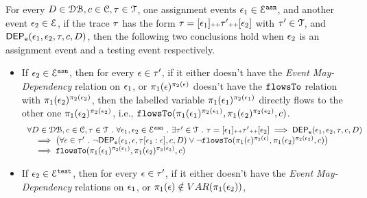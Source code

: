 \begin{lem}
		\label{lem:inv_indepevents}
		For every $D \in \mathcal{DB} , c \in \mathcal{C}, \mathtt{\tau} \in \mathcal{T}$, one assignment events 
		$\mathtt{\epsilon}_1\in \mathcal{E}^{\mathtt{{asn}}}$, and another event $\mathtt{\epsilon}_2 \in \mathcal{E}$,
		if the trace $\mathtt{\tau}$ has the form $\mathtt{\tau} = [\mathtt{\epsilon}_1] {\scriptscriptstyle ++} \mathtt{\tau}' {\scriptscriptstyle ++} [\mathtt{\epsilon}_2]$ with $\mathtt{\tau}' \in \mathcal{T}$, 
		and $\mathsf{DEP_{\mathtt{e}}}(\mathtt{\epsilon}_1, \mathtt{\epsilon}_2, \mathtt{\tau}, c, D)$,
		then the following two conclusions hold when $\mathtt{\epsilon}_2$ is an assignment event and a testing event respectively.
	\begin{itemize}
		\item
		If $\mathtt{\epsilon}_2 \in \mathcal{E}^{\mathtt{{asn}}}$,
		then for every $\mathtt{\epsilon} \in \mathtt{\tau}'$, if it either doesn't have the \emph{Event May-Dependency} relation on $\mathtt{\epsilon}_1$, 
		or $\pi_1(\mathtt{\epsilon})^{\pi_2(\mathtt{\epsilon})}$ doesn't have the $\mathtt{flowsTo}$ relation with $ \pi_1(\mathtt{\epsilon}_2)^{\pi_2(\mathtt{\epsilon}_2)}$,
		then the labelled variable $\pi_1(\mathtt{\epsilon}_1)^{\pi_2(\mathtt{\epsilon}_1)}$ directly flows to the other one $\pi_1(\mathtt{\epsilon}_2)^{\pi_2(\mathtt{\epsilon}_2)}$, 
		i.e., $\mathtt{flowsTo}(\pi_1(\mathtt{\epsilon}_1)^{\pi_2(\mathtt{\epsilon}_1)}, \pi_1(\mathtt{\epsilon}_2)^{\pi_2(\mathtt{\epsilon}_2)}, c)$.
		\[
		\begin{array}{l}
			\forall D \in \dbdom , c \in \cdom, \trace \in \mathcal{T} \st \forall \event_1, \event_2 \in \eventset^{\asn} \st
			 \exists \trace' \in \mathcal{T} \st \trace = [\event_1] \tracecat \trace' \tracecat [\event_2]
			\implies
			\eventdep(\event_1, \event_2, \trace, c, D) 
			\\ \quad 
			\implies 
			\left( \forall \event \in \trace' \st \neg \eventdep(\event_1, \event, \trace[\event_1:\event], c, D)
			\lor \neg \flowsto(\pi_1(\event)^{\pi_2(\event)}, \pi_1(\event_2)^{\pi_2(\event_2)}, c) 
			\right) 
			\\ \quad 
			\implies 
			\flowsto(\pi_1(\event_1)^{\pi_2(\event_1)}, \pi_1(\event_2)^{\pi_2(\event_2)}, c)
		\end{array}
		\]
		\item
If $\mathtt{\epsilon}_2 \in \mathcal{E}^{\mathtt{{test}}}$, 
then for every $\mathtt{\epsilon} \in \mathtt{\tau}'$, if it either doesn't have the \emph{Event May-Dependency} relations on $\mathtt{\epsilon}_1$,
or $\pi_1(\mathtt{\epsilon}) \notin VAR(\pi_1(\mathtt{\epsilon}_2)) $,

\end{itemize}
\end{lem}
